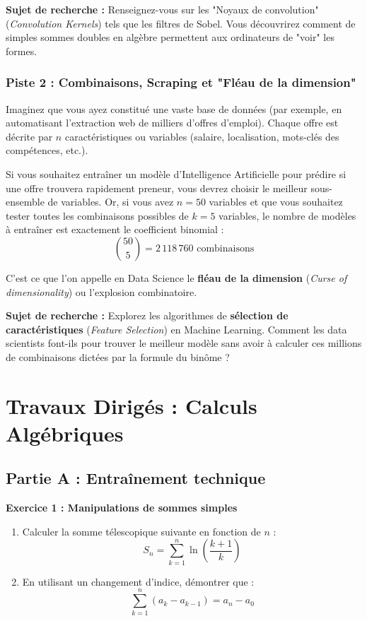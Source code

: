 \textbf{Sujet de recherche :} Renseignez-vous sur les "Noyaux de convolution" (\textit{Convolution Kernels}) tels que les filtres de Sobel. Vous découvrirez comment de simples sommes doubles en algèbre permettent aux ordinateurs de "voir" les formes.

\subsection*{Piste 2 : Combinaisons, Scraping et "Fléau de la dimension"}
Imaginez que vous ayez constitué une vaste base de données (par exemple, en automatisant l'extraction web de milliers d'offres d'emploi). Chaque offre est décrite par $n$ caractéristiques ou variables (salaire, localisation, mots-clés des compétences, etc.). 

Si vous souhaitez entraîner un modèle d'Intelligence Artificielle pour prédire si une offre trouvera rapidement preneur, vous devrez choisir le meilleur sous-ensemble de variables. Or, si vous avez $n=50$ variables et que vous souhaitez tester toutes les combinaisons possibles de $k=5$ variables, le nombre de modèles à entraîner est exactement le coefficient binomial :
$$ \binom{50}{5} = 2\,118\,760 \text{ combinaisons} $$

C'est ce que l'on appelle en Data Science le \textbf{fléau de la dimension} (\textit{Curse of dimensionality}) ou l'explosion combinatoire. 

\textbf{Sujet de recherche :} Explorez les algorithmes de \textbf{sélection de caractéristiques} (\textit{Feature Selection}) en Machine Learning. Comment les data scientists font-ils pour trouver le meilleur modèle sans avoir à calculer ces millions de combinaisons dictées par la formule du binôme ?


\chapter*{Travaux Dirigés : Calculs Algébriques}

\section*{Partie A : Entraînement technique}

\textbf{Exercice 1 : Manipulations de sommes simples}
\begin{enumerate}
    \item Calculer la somme télescopique suivante en fonction de $n$ : 
    $$ S_n = \sum_{k=1}^{n} \ln\left(\frac{k+1}{k}\right) $$
    \item En utilisant un changement d'indice, démontrer que :
    $$ \sum_{k=1}^{n} (a_k - a_{k-1}) = a_n - a_0 $$
\end{enumerate}

